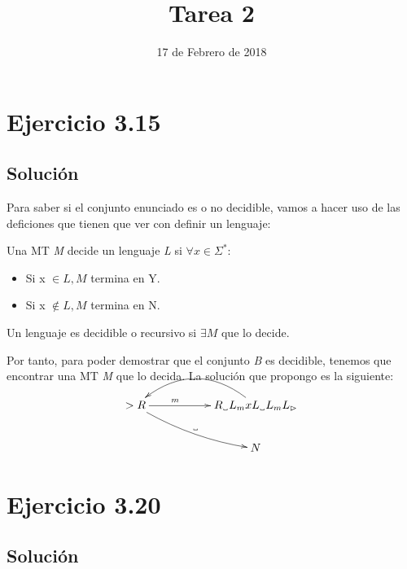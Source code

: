 \documentclass[11pt, a4paper, titlepage]{article}
\newcommand\vartextvisiblespace[1][.5em]{%
  \makebox[#1]{%
    \kern.07em
    \vrule height.3ex
    \hrulefill
    \vrule height.3ex
    \kern.07em
  }%
}
\begin{document}
\title{Tarea 2}
\date{17 de Febrero de 2018}
\maketitle
\newpage



\section*{Ejercicio 3.15}
\subsection*{Solución}


Para saber si el conjunto enunciado es o no decidible, vamos a hacer uso de las
deficiones que tienen que ver con definir un lenguaje:

Una MT \textit{M} decide un lenguaje \textit{L} si $\forall x \in \Sigma^*:$
\begin{itemize}
  \item Si x $\in \textit{L}, \textit{M}$ termina en Y.
  \item Si x $\notin \textit{L}, \textit{M}$ termina en N.
\end{itemize}

Un lenguaje es decidible o recursivo si $\exists \textit{M}$ que lo decide.


Por tanto, para poder demostrar que el conjunto \textit{B} es decidible, tenemos
que encontrar una MT \textit{M} que lo decida. La solución que propongo es la
siguiente:
\pagebreak


\[
\xymatrix{
  >R \ar[rr]^(.33){m} \ar@/_/[drr]^{\vartextvisiblespace} & & R_{\vartextvisiblespace}L_{m}xL_{\vartextvisiblespace}L_{m}L_{\rhd} \ar@/_2pc/[ll] \\
  &&N
}
\]






\section*{Ejercicio 3.20}
\subsection*{Solución}
\end{document}
